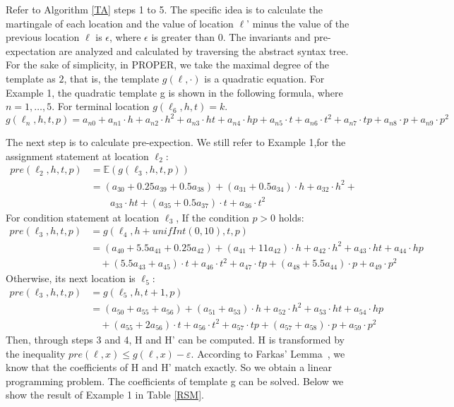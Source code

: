 \documentclass[runningheads]{llncs}
\begin{document}
Refer to Algorithm \ref{TA} steps 1 to 5. The specific idea is to calculate the martingale of each location and the value of location $\ell$' minus the value of the previous location $\ell$ is $\epsilon$, where $\epsilon$ is greater than $0$. The invariants and pre-expectation are analyzed and calculated by traversing the abstract syntax tree. For the sake of simplicity, in PROPER, we take the maximal degree of the template as $2$, that is, the template $g(\ell,\cdot)$ is a quadratic equation. For Example 1, the quadratic template g is shown in the following formula, where $n=1,\ldots,5$. For terminal location $g(\ell_6,h,t)=k$. 
$$g(\!\ell_n,h,t,p\!)\!=\!a_{n0}\!+\!a_{n1}\cdot h\!+\!a_{n2}\cdot h^{2}\!+\!a_{n3}\cdot ht \!+\!a_{n4}\cdot hp\!+\!a_{n5}\cdot t\!+\!a_{n6}\cdot t^{2}+\!a_{n7}\cdot tp\!+\!a_{n8}\cdot p\!+\!a_{n9}\cdot p^{2}$$

The next step is to calculate pre-expection. We still refer to Example 1,for the assignment statement at location $\ell_2$:
\begin{align*}
pre(\ell_2,h,t,p)&=\mathbb{E}(g(\ell_3,h,t,p)) \\
&= (a_{30}+0.25a_{39}+0.5a_{38})+(a_{31}+0.5a_{34})\cdot h+a_{32}\cdot h^{2}+\\&\qquad a_{33}\cdot ht+(a_{35}+0.5a_{37})\cdot t+a_{36}\cdot t^{2}  
\end{align*}
For condition statement at location $\ell_3$, If the condition $p>0$ holds:
\begin{align*}
pre(\!\ell_3,h,t,p\!)&\!=\!g(\ell_4,h+unifInt(0,10),t,p) \\
&\!=\!(a_{40}\!+\!5.5a_{41}\!+\!0.25a_{42})\!+\!(a_{41}\!+\!11a_{42})\!\cdot\! h\!+\!a_{42}\!\cdot\! h^{2}\!+\!a_{43}\!\cdot\!ht\!+\!a_{44}\!\cdot\! hp\\&\quad +(5.5a_{43}\!+\!a_{45})\!\cdot\! t\!+\! a_{46}\!\cdot\! t^{2}\!+\!a_{47}\!\cdot\! tp +(a_{48}\!+\!5.5a_{44})\!\cdot\! p\!+\!a_{49}\!\cdot\! p^{2} 
\end{align*}
Otherwise, its next location is $\ell_5$:
\begin{align*}
pre(\ell_3,h,t,p)&=g(\ell_5,h,t+1,p) \\
&=(a_{50}\!+\!a_{55}\!+\!a_{56})+(a_{51}\!+\!a_{53})\cdot h +a_{52}\cdot h^{2}+a_{53}\cdot ht+a_{54}\cdot hp\\&\quad +(a_{55}+2a_{56})\cdot t+a_{56}\cdot t^{2}+a_{57}\cdot tp+(a_{57}+a_{58})\cdot p+a_{59}\cdot p^{2}
\end{align*}
Then, through steps 3 and 4, H and H' can be computed. H is transformed by the inequality $pre(\ell,x)\leq g(\ell,x)-\varepsilon$.  According to Farkas' Lemma~\cite{Farkas1894}, we know that the coefficients of H and H' match exactly. So we obtain a linear programming problem. The coefficients of template g can be solved. Below we show the result of Example 1 in Table \ref{RSM}. 
\end{document}
